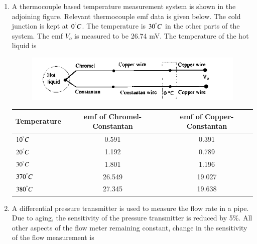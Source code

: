 \documentclass[journal,12pt,onecolumn]{IEEEtran}
\theoremstyle{remark}
\begin{document}
\begin{enumerate}
\item A thermocouple based temperature measurement system is shown in the adjoining figure. Relevant thermocouple emf data  is given below. The cold junction is kept at $0^\degree C$. The temperature is $30^\degree C$ in the other parts of the system. The emf $V_o$ is measured to be 26.74 mV. The temperature of the hot liquid is
\begin{figure}[H]
    \centering
    \includegraphics[width = 0.7\columnwidth]{q35}
    \caption*{}
    \label{Q35}
\end{figure}
\begin{center}
\begin{tabular}{|l|c|c|}
    \hline
    \textbf{Temperature} & \textbf{emf of Chromel-Constantan} & \textbf{emf of Copper-Constantan} \\
    \hline
    $10^\degree C$ & 0.591 & 0.391 \\
    \hline
    $20^\degree C$ & 1.192 & 0.789 \\
    \hline
    $30^\degree C$ & 1.801 & 1.196 \\
    \hline
    $370^\degree C$ & 26.549 & 19.027 \\
    \hline
    $380^\degree C$ & 27.345 & 19.638 \\
    \hline
\end{tabular}
\end{center}
\begin{enumerate}  \end{enumerate}



\item A differential pressure transmitter is used to measure the flow rate in a pipe. Due to aging, the sensitivity of the pressure transmitter is reduced by 5\%. All other aspects of the flow meter remaining constant, change in the sensitivity of the flow measurement is
\hfill{}\begin{enumerate}  \end{enumerate}




\end{enumerate}
\end{document}
